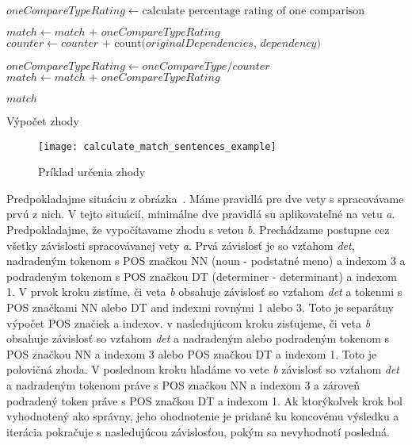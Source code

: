 \begin{algorithm}[H]
	\footnotesize %
	\begin{algorithmic}[1]

		\State $oneCompareTypeRating \gets \text{calculate percentage rating of one comparison}$
		
		\State $match \gets match \text{ + } oneCompareTypeRating$
		\EndIf
		\State $counter \gets counter \text{ + } \text{count(}originalDependencies\text{, } dependency\text{)}$
		\EndFor
		
		\State $oneCompareTypeRating \gets oneCompareType / counter$
		\State $match \gets match \text{ + } oneCompareTypeRating$
		\EndIf
		\EndFor
		\EndFor
		\EndFor
		
		\Return $match$
		\EndProcedure
	\end{algorithmic}
	\caption[Výpočet zhody]{Výpočet zhody}	
	\label{alg:calculating_match}
\end{algorithm}

\begin{figure}[H]
	\begin{center}\texttt{[image: calculate\_match\_sentences\_example]}\end{center}
	\caption[Príklad určenia zhody]{Príklad určenia zhody}\label{fig:calculate_match_sentences_example}
\end{figure}

Predpokladajme situáciu z obrázka~. Máme pravidlá pre dve vety s spracovávame prvú z nich. V tejto situácií, minimálne dve pravidlá su aplikovateľné na vetu \textit{a}. Predpokladajme, že vypočítavame zhodu s vetou \textit{b}. Prechádzame postupne cez všetky závislosti spracovávanej vety \textit{a}. Prvá závislosť je so vzťahom \textit{det}, nadradeným tokenom s POS značkou NN (noun - podstatné meno) a indexom 3 a podradeným tokenom s POS značkou DT (determiner - determinant) a indexom 1. V prvok kroku zistíme, či veta \textit{b} obsahuje závislosť so vzťahom \textit{det} a tokenmi s POS značkami NN alebo DT and indexmi rovnými 1 alebo 3. Toto je separátny výpočet POS značiek a indexov. v nasledujúcom kroku zisťujeme, či veta \textit{b} obsahuje závislosť so vzťahom \textit{det} a nadradeným alebo podradeným tokenom s POS značkou NN a indexom 3 alebo POS značkou DT a indexom 1. Toto je polovičná zhoda. V poslednom kroku hľadáme vo vete \textit{b} závislosť so vzťahom \textit{det} a nadradeným tokenom práve s POS značkou NN a indexom 3 a zároveň podradený token práve s POS značkou DT a indexom 1. Ak ktorýkoľvek krok bol vyhodnotený ako správny, jeho ohodnotenie je pridané ku koncovému výsledku a iterácia pokračuje s nasledujúcou závislosťou, pokým sa nevyhodnotí posledná.

